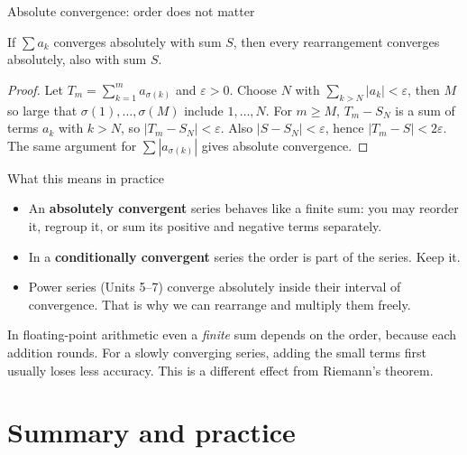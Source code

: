 \documentclass{wosm-slides}
\begin{document}
\begin{frame}{Absolute convergence: order does not matter}
  \begin{theorem}
    If $\sum a_k$ converges absolutely with sum $S$, then every rearrangement converges
    absolutely, also with sum $S$.
  \end{theorem}
  \pause
  \begin{proof}
    Let $T_m = \sum_{k=1}^m a_{\sigma(k)}$ and $\varepsilon > 0$. Choose $N$ with
    $\sum_{k > N} |a_k| < \varepsilon$, then $M$ so large that
    $\sigma(1), \dots, \sigma(M)$ include $1, \dots, N$.
    For $m \ge M$, $T_m - S_N$ is a sum of terms $a_k$ with $k > N$, so
    $|T_m - S_N| < \varepsilon$. Also $|S - S_N| < \varepsilon$, hence $|T_m - S| < 2\varepsilon$.
    The same argument for $\sum |a_{\sigma(k)}|$ gives absolute convergence.
  \end{proof}
\end{frame}

\begin{frame}{What this means in practice}
  \begin{itemize}
    \item An \textbf{absolutely convergent} series behaves like a finite sum: you may
      reorder it, regroup it, or sum its positive and negative terms separately.
    \item In a \textbf{conditionally convergent} series the order is part of the series.
      Keep it.
    \item Power series (Units 5--7) converge absolutely inside their interval of convergence.
      That is why we can rearrange and multiply them freely.
  \end{itemize}
  \pause
  \begin{remark}[On a computer]
    In floating-point arithmetic even a \emph{finite} sum depends on the order, because each
    addition rounds. For a slowly converging series, adding the small terms first usually
    loses less accuracy. This is a different effect from Riemann's theorem.
  \end{remark}
\end{frame}

\section{Summary and practice}
\end{document}
